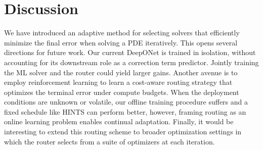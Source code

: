 \documentclass{article} %
\newcommand\ambuj[1]{\textcolor{red}{AT: #1}}
\begin{document}
\section{Discussion}

We have introduced an adaptive method for selecting solvers that efficiently minimize the final error when solving a PDE iteratively. This opens several directions for future work. Our current DeepONet is trained in isolation, without accounting for its downstream role as a correction term predictor. Jointly training the ML solver and the router could yield larger gains. Another avenue is to employ reinforcement learning to learn a cost-aware routing strategy that optimizes the terminal error under compute budgets. 
When the deployment conditions are unknown or volatile, our offline training procedure suffers and a fixed schedule like HINTS can perform better, however, framing routing as an online learning problem enables continual adaptation. Finally, it would be interesting to extend this routing scheme to broader optimization settings in which the router selects from a suite of optimizers at each iteration.





\end{document}
